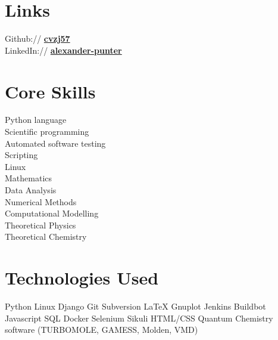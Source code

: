 \documentclass[letterpaper]{deedy-resume-openfont} %
\begin{document}
\begin{minipage}[t]{0.33\textwidth}
\section{Links} 

Github:// \href{https://github.com/cvzj57}{\bf cvzj57} \\
LinkedIn:// \href{https://www.linkedin.com/in/alexander-punter/}{\bf alexander-punter} \\

\sectionspace %


\section[]{Core Skills}

Python language \\
Scientific programming \\
Automated software testing \\
Scripting \\
Linux \\
Mathematics \\
Data Analysis \\
Numerical Methods \\
Computational Modelling \\
Theoretical Physics \\
Theoretical Chemistry \\

\sectionspace %

\section[]{Technologies Used}

Python \textbullet{} Linux \textbullet{} Django \textbullet{} Git \textbullet{} Subversion \textbullet{} LaTeX \textbullet{} Gnuplot \textbullet{} Jenkins \textbullet{} Buildbot \textbullet{} Javascript \textbullet{} SQL \textbullet{} Docker \textbullet{} Selenium \textbullet{}   Sikuli \textbullet{} HTML/CSS \textbullet{} Quantum Chemistry software (TURBOMOLE, GAMESS, Molden, VMD)  


\end{minipage}
\end{document}
